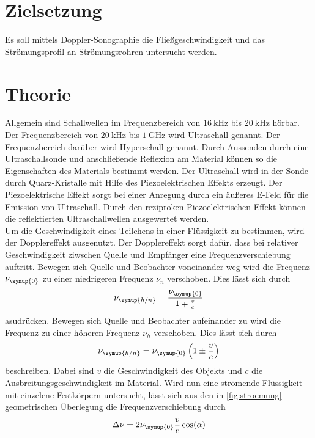 \section{Zielsetzung}
\label{sec:Zielsetzung}
Es soll mittels Doppler-Sonographie die Fließgeschwindigkeit und das Strömungsprofil an Strömungsrohren
untersucht werden.

\section{Theorie}
\label{sec:Theorie}
Allgemein sind Schallwellen im Frequenzbereich von $\SI{16}{\kilo\hertz}$ bis $\SI{20}{\kilo\hertz}$ hörbar.
Der Frequenzbereich von $\SI{20}{\kilo\hertz}$ bis $\SI{1}{\giga\hertz}$ wird Ultraschall genannt. Der
Frequenzbereich darüber wird Hyperschall genannt. Durch Aussenden durch eine Ultraschallsonde und anschließende
Reflexion am Material können so die Eigenschaften des Materials bestimmt werden. Der Ultraschall wird in der Sonde
durch Quarz-Kristalle mit Hilfe des Piezoelektrischen Effekts erzeugt. Der Piezoelektrische Effekt sorgt bei einer
Anregung durch ein äußeres E-Feld für die Emission von Ultraschall. Durch den reziproken Piezoelektrischen
Effekt können die reflektierten Ultraschallwellen ausgewertet werden.\\
Um die Geschwindigkeit eines Teilchens in einer Flüssigkeit zu bestimmen, wird der Dopplereffekt ausgenutzt.
Der Dopplereffekt sorgt dafür, dass bei relativer Geschwindigkeit ziwschen Quelle und Empfänger eine
Frequenzverschiebung auftritt. Bewegen sich Quelle und Beobachter voneinander weg wird die Frequenz
$\nu_{\symup{0}}$ zu einer niedrigeren Frequenz $\nu_{n}$ verschoben. Dies lässt sich durch
\begin{equation}
    \label{dopplern}
    \nu_{\symup{h/n}} = \frac{\nu_{\symup{0}}}{1\mp \frac{v}{c}}
\end{equation}
asudrücken.
Bewegen sich Quelle und Beobachter aufeinander zu wird die Frequenz zu einer höheren Frequenz $\nu_{h}$ verschoben.
Dies lässt sich durch 
\begin{equation}
    \label{eqn:dopplerh}
    \nu_{\symup{h/n}} = \nu_{\symup{0}}\left(1 \pm \frac{v}{c}\right)
\end{equation}
beschreiben. Dabei sind $v$ die Geschwindigkeit des Objekts und $c$ die Ausbreitungsgeschwindigkeit im Material.
Wird nun eine strömende Flüssigkeit mit einzelene Festkörpern untersucht, lässt sich aus den in
\autoref{fig:stroemung} geometrischen Überlegung die Frequenzverschiebung durch
\begin{equation}
    \label{eqn:fdiff}
    \Delta \nu = 2\nu_{\symup{0}}\frac{v}{c}\cos(\alpha)
\end{equation}

